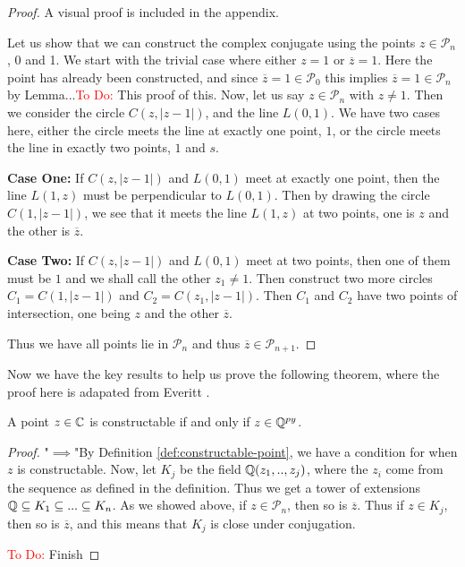 \begin{proof}  
    A visual proof is included in the appendix.
    
    Let us show that we can construct the complex conjugate using the points $z\in \mathcal{P}_n$, 0 and 1.
    We start with the trivial case where either $z=1$ or $\overline{z}=1$. Here the point has already been constructed, and since $\overline{z}=1\in \mathcal{P}_0$ this implies $\overline{z}=1\in \mathcal{P}_n$ by Lemma...\textcolor{red}{To Do:} This proof of this.
\newline
\noindent
    Now, let us say $z\in \mathcal{P}_n$ with $z\neq1$. Then we consider the circle $C(z,|z-1|)$, and the line $L(0,1)$. We have two cases here, either the circle meets the line at exactly one point, $1$, or the circle meets the line in exactly two points, $1$ and $s$.

    \textbf{Case One:} If $C(z,|z-1|)$ and $L(0,1)$ meet at exactly one point, then the line $L(1,z)$ must be perpendicular to $L(0,1)$. Then by drawing the circle $C(1,|z-1|)$, we see that it meets the line $L(1,z)$ at two points, one is $z$ and the other is $\overline{z}$.

    \textbf{Case Two:} If $C(z,|z-1|)$ and $L(0,1)$ meet at two points, then one of them must be $1$ and we shall call the other $z_1\neq1$. Then construct two more circles $C_1=C(1,|z-1|)$ and $C_2=C(z_1,|z-1|)$. Then $C_1$ and $C_2$ have two points of intersection, one being $z$ and the other $\overline{z}$.

    Thus we have all points lie in $\mathcal{P}_n$ and thus $\overline{z} \in \mathcal{P}_{n+1}$.
\end{proof}

Now we have the key results to help us prove the following theorem, where the proof here is adapated from Everitt \cite{constructions-and-galois}.

\begin{theorem}
    A point $z \in \mathbb C$ is constructable if and only if $z \in \mathbb Q^{py}$.
\end{theorem}

\begin{proof}
    "$\implies$"By Definition \ref{def:constructable-point}, we have a condition for when $z$ is constructable. Now, let $K_j$ be the field $\mathbb Q(z_1,..,z_j)$, where the $z_i$ come from the sequence as defined in the definition. Thus we get a tower of extensions $\mathbb Q \subseteq K_1 \subseteq ... \subseteq K_n$.
    As we showed above, if $z\in \mathcal{P}_n$, then so is $\overline{z}$. Thus if $z\in K_j$, then so is $\overline{z}$, and this means that $K_j$ is close under conjugation.

    \textcolor{red}{To Do:} Finish
\end{proof}

